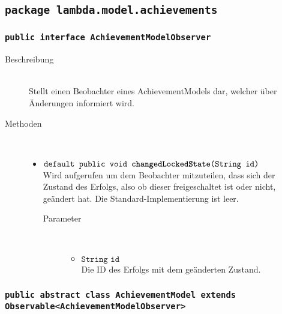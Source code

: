 \subsection{\texttt{package lambda.model.achievements}}

\subsubsection{\normalfont \texttt{public interface \textbf{AchievementModelObserver}}}

\begin{description}
\item[Beschreibung] \hfill \\ Stellt einen Beobachter eines AchievementModels dar, welcher über Änderungen informiert wird.

\item[Methoden] \hfill \\
	\vspace{-.8cm}
	\begin{itemize}
		\item $\texttt{default public void \textbf{changedLockedState}(String id)}$ \\ Wird aufgerufen um dem Beobachter mitzuteilen, dass sich der Zustand des Erfolgs, also ob dieser freigeschaltet ist oder nicht, geändert hat. Die Standard-Implementierung ist leer.
			\begin{description}
			\item[Parameter] \hfill \\
			\vspace{-.8cm}
			\begin{itemize}
				\item $\texttt{String id}$ \\ Die ID des Erfolgs mit dem geänderten Zustand.
			\end{itemize}
			\end{description}
	\end{itemize}
\end{description}

\subsubsection{\normalfont \texttt{public abstract class \textbf{AchievementModel} extends Observable<AchievementModelObserver>}}


